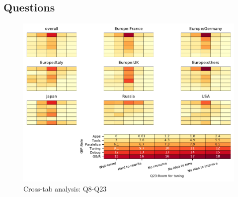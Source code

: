 
\subsection{Questions}


\begin{figure}
\begin{center}
\includegraphics[width=12cm]{../pdfs/Q8-Q23.pdf}
\caption{Cross-tab analysis: Q8-Q23}
\label{fig:Q8-Q23}
\end{center}
\end{figure}

